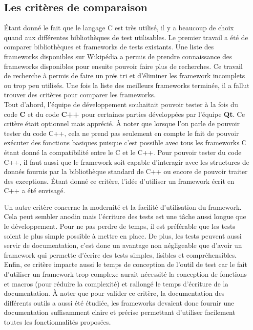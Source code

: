 \documentclass[a4paper]{article}
\begin{document}
\subsection{Les critères de comparaison}%

Étant donné le fait que le langage C est très utilisé, il y a beaucoup de choix
quand aux différentes bibliothèques de test utilisables. Le premier travail a
été de comparer bibliothèques et frameworks de tests existants. Une liste des
frameworks disponibles sur Wikipédia \cite{enwikiframeworks} a permis de prendre
connaissance des frameworks disponibles pour ensuite pouvoir faire plus de
recherches. Ce travail de recherche à permis de faire un prés tri et d'éliminer
les framework incomplets ou trop peu utilisés. Une fois la liste des meilleurs
frameworks terminée, il a fallut trouver des critères pour comparer les
frameworks. \\

Tout d'abord, l'équipe de développement souhaitait pouvoir tester à la fois du
code \textbf{C} et du code \textbf{C++} pour certaines parties développées par
l'équipe \textbf{Qt}. Ce critère était optionnel mais apprécié. À noter que
lorsque l'on parle de pouvoir tester du code C++, cela ne prend pas seulement en
compte le fait de pouvoir exécuter des fonctions basiques puisque c'est possible
avec tous les frameworks C étant donné la compatibilité entre le C et le C++.
Pour pouvoir tester du code C++, il faut aussi que le framework soit capable
d'interagir avec les structures de donnés fournis par la bibliothèque standard
de C++ ou encore de pouvoir traiter des exceptions. Étant donné ce critère,
l'idée d'utiliser un framework écrit en C++ a été envisagé.

Un autre critère concerne la modernité et la facilité d'utilisation du
framework. Cela peut sembler anodin mais l'écriture des tests est une tâche
aussi longue que le développement. Pour ne pas perdre de temps, il est
préférable que les tests soient le plus simple possible à mettre en place. De
plus, les tests peuvent aussi servir de documentation, c'est donc un avantage
non négligeable que d'avoir un framework qui permette d'écrire des tests
simples, lisibles et compréhensibles. Enfin, ce critère impacte aussi le temps
de conception de l'outil de test car le fait d'utiliser un framework trop
complexe aurait nécessité la conception de fonctions et macros (pour réduire la
complexité) et rallongé le temps d'écriture de la documentation. À noter que
pour valider ce critère, la documentation des différents outils a aussi été
étudiée, les frameworks devaient donc fournir une documentation suffisamment
claire et précise permettant d'utiliser facilement toutes les fonctionnalités
proposées.
\end{document}
